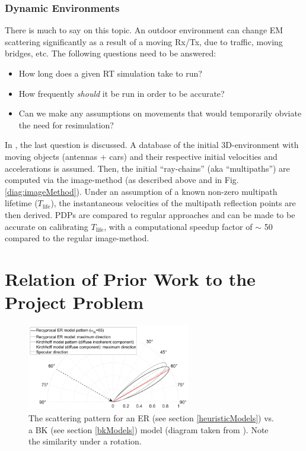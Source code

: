\documentclass[lettersize,journal]{IEEEtran}
\begin{document}
\subsubsection{Dynamic Environments} \label{dynSection}
There is much to say on this topic. An outdoor environment can change EM scattering significantly as a result of a moving Rx/Tx, due to traffic, moving bridges, etc. The following questions need to be answered:
\begin{itemize}
    \item How long does a given RT simulation take to run?
    \item How frequently \emph{should} it be run in order to be accurate?
    \item Can we make any assumptions on movements that would temporarily obviate the need for resimulation?
\end{itemize}
In \cite{ref:dynamicRTPaper}, the last question is discussed. A database of the initial 3D-environment with moving objects (antennas + cars) and their respective initial velocities and accelerations is assumed. Then, the initial ``ray-chains'' (aka ``multipaths'') are computed via the image-method (as described above and in Fig. \ref{diag:imageMethod}). Under an assumption of a known non-zero multipath lifetime ($T_{\text{life}}$), the instantaneous velocities of the multipath reflection points are then derived. PDPs are compared to regular approaches and can be made to be accurate on calibrating $T_{\text{life}}$, with a computational speedup factor of $\sim$ 50 compared to the regular image-method.

\pagebreak

\section{Relation of Prior Work to the Project Problem}

\begin{figure}[!htb]
\centering
\includegraphics[width=2.8in]{parametricForm}
\captionsetup{singlelinecheck=off}
	\caption[]{The scattering pattern for an ER (see section \ref{heuristicModels}) vs. a BK (see section \ref{bkModels}) model (diagram taken from \cite{ref:reciprocalHeur}). Note the similarity under a rotation.}
\label{diag:parametricForm}
\end{figure}
\end{document}

